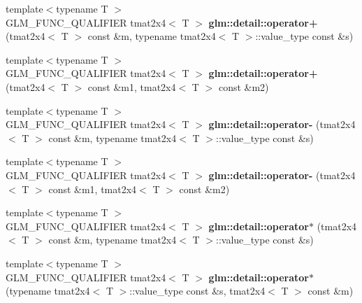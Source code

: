 \begin{DoxyCompactItemize}
\item 
\hypertarget{namespaceglm_1_1detail_ac5aeeee3f6ba464d32ea8c260c85ef87}{{\footnotesize template$<$typename T $>$ }\\G\-L\-M\-\_\-\-F\-U\-N\-C\-\_\-\-Q\-U\-A\-L\-I\-F\-I\-E\-R tmat2x4$<$ T $>$ {\bfseries glm\-::detail\-::operator+} (tmat2x4$<$ T $>$ const \&m, typename tmat2x4$<$ T $>$\-::value\-\_\-type const \&s)}\label{namespaceglm_1_1detail_ac5aeeee3f6ba464d32ea8c260c85ef87}

\item 
\hypertarget{namespaceglm_1_1detail_a25a5f14cc6791e18cfd894073be275a0}{{\footnotesize template$<$typename T $>$ }\\G\-L\-M\-\_\-\-F\-U\-N\-C\-\_\-\-Q\-U\-A\-L\-I\-F\-I\-E\-R tmat2x4$<$ T $>$ {\bfseries glm\-::detail\-::operator+} (tmat2x4$<$ T $>$ const \&m1, tmat2x4$<$ T $>$ const \&m2)}\label{namespaceglm_1_1detail_a25a5f14cc6791e18cfd894073be275a0}

\item 
\hypertarget{namespaceglm_1_1detail_a80391a343f26bf8efd1a7df9947870b6}{{\footnotesize template$<$typename T $>$ }\\G\-L\-M\-\_\-\-F\-U\-N\-C\-\_\-\-Q\-U\-A\-L\-I\-F\-I\-E\-R tmat2x4$<$ T $>$ {\bfseries glm\-::detail\-::operator-\/} (tmat2x4$<$ T $>$ const \&m, typename tmat2x4$<$ T $>$\-::value\-\_\-type const \&s)}\label{namespaceglm_1_1detail_a80391a343f26bf8efd1a7df9947870b6}

\item 
\hypertarget{namespaceglm_1_1detail_ac826b092d67f6b9cfc34f424c3f5a4d4}{{\footnotesize template$<$typename T $>$ }\\G\-L\-M\-\_\-\-F\-U\-N\-C\-\_\-\-Q\-U\-A\-L\-I\-F\-I\-E\-R tmat2x4$<$ T $>$ {\bfseries glm\-::detail\-::operator-\/} (tmat2x4$<$ T $>$ const \&m1, tmat2x4$<$ T $>$ const \&m2)}\label{namespaceglm_1_1detail_ac826b092d67f6b9cfc34f424c3f5a4d4}

\item 
\hypertarget{namespaceglm_1_1detail_af770a5a4723b5dce1e66a7e315a851e4}{{\footnotesize template$<$typename T $>$ }\\G\-L\-M\-\_\-\-F\-U\-N\-C\-\_\-\-Q\-U\-A\-L\-I\-F\-I\-E\-R tmat2x4$<$ T $>$ {\bfseries glm\-::detail\-::operator$\ast$} (tmat2x4$<$ T $>$ const \&m, typename tmat2x4$<$ T $>$\-::value\-\_\-type const \&s)}\label{namespaceglm_1_1detail_af770a5a4723b5dce1e66a7e315a851e4}

\item 
\hypertarget{namespaceglm_1_1detail_abbfcc88b6c615da805a3974036d51cde}{{\footnotesize template$<$typename T $>$ }\\G\-L\-M\-\_\-\-F\-U\-N\-C\-\_\-\-Q\-U\-A\-L\-I\-F\-I\-E\-R tmat2x4$<$ T $>$ {\bfseries glm\-::detail\-::operator$\ast$} (typename tmat2x4$<$ T $>$\-::value\-\_\-type const \&s, tmat2x4$<$ T $>$ const \&m)}\label{namespaceglm_1_1detail_abbfcc88b6c615da805a3974036d51cde}


\end{DoxyCompactItemize}
